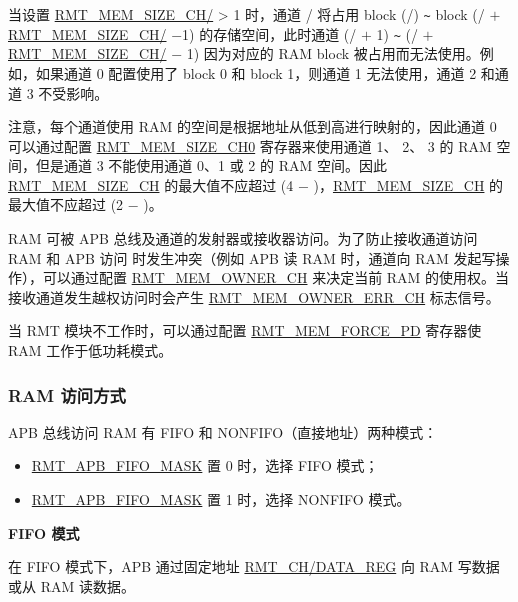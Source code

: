 \documentclass[main\_\_CN.tex]{subfiles}
\begin{document}
当设置 \hyperref[fielddesc:RMTMEMSIZECHN]{RMT\_MEM\_SIZE\_CH/} > 1 时，通道 / 将占用 block (/) \verb+~+ block (/ $+$ \hyperref[fielddesc:RMTMEMSIZECHN]{RMT\_MEM\_SIZE\_CH/} $-$1) 的存储空间，此时通道 (/ $+$ 1) \verb+~+ (/ $+$ \hyperref[fielddesc:RMTMEMSIZECHN]{RMT\_MEM\_SIZE\_CH/} $-$ 1) 因为对应的 RAM block 被占用而无法使用。例如，如果通道 0 配置使用了 block 0 和 block 1，则通道 1 无法使用，通道 2 和通道 3 不受影响。


注意，每个通道使用 RAM 的空间是根据地址从低到高进行映射的，因此通道 0 可以通过配置 \hyperref[fielddesc:RMTMEMSIZECHN]{RMT\_MEM\_SIZE\_CH0} 寄存器来使用通道 1、 2、 3 的 RAM 空间，但是通道 3 不能使用通道 0、1 或 2 的 RAM 空间。因此 \hyperref[fielddesc:RMTMEMSIZECHN]{RMT\_MEM\_SIZE\_CH} 的最大值不应超过 (4 $-$ )，\hyperref[fielddesc:RMTMEMSIZECHM]{RMT\_MEM\_SIZE\_CH} 的最大值不应超过 (2 $-$ )。

RAM 可被 APB 总线及通道的发射器或接收器访问。为了防止接收通道访问 RAM 和 APB 访问 时发生冲突（例如 APB 读 RAM 时，通道向 RAM 发起写操作），可以通过配置 \hyperref[fielddesc:RMTMEMOWNERCHM]{RMT\_MEM\_OWNER\_CH} 来决定当前 RAM 的使用权。当接收通道发生越权访问时会产生 \hyperref[fielddesc:RMTMEMOWNERERRCHM]{RMT\_MEM\_OWNER\_ERR\_CH} 标志信号。 

当 RMT 模块不工作时，可以通过配置 \hyperref[fielddesc:RMTMEMFORCEPD]{RMT\_MEM\_FORCE\_PD} 寄存器使 RAM 工作于低功耗模式。

\subsubsection{RAM 访问方式}
APB 总线访问 RAM 有 FIFO 和 NONFIFO（直接地址）两种模式：
\begin{itemize}
    \item \hyperref[fielddesc:RMTAPBFIFOMASK]{RMT\_APB\_FIFO\_MASK} 置 0 时，选择 FIFO 模式；
    \item \hyperref[fielddesc:RMTAPBFIFOMASK]{RMT\_APB\_FIFO\_MASK} 置 1 时，选择 NONFIFO 模式。
\end{itemize}

\textbf{FIFO 模式}

在 FIFO 模式下，APB 通过固定地址 \hyperref[regdesc:RMTCHNDATAREG]{RMT\_CH/DATA\_REG} 向 RAM 写数据或从 RAM 读数据。
\end{document}
